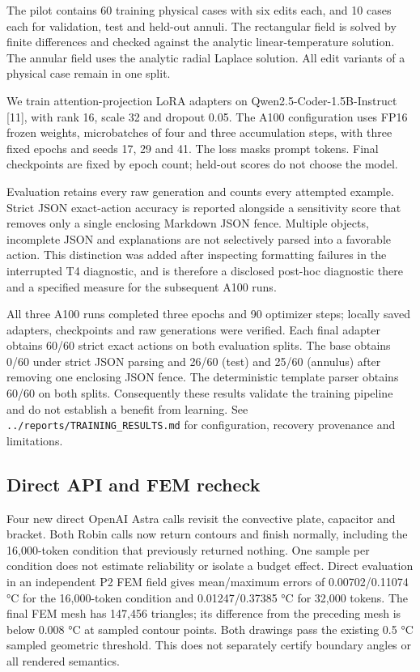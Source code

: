 \documentclass[
  11pt,
  a4paper,
]{article}
\begin{document}
The pilot contains 60 training physical cases with six edits each, and
10 cases each for validation, test and held-out annuli. The rectangular
field is solved by finite differences and checked against the analytic
linear-temperature solution. The annular field uses the analytic radial
Laplace solution. All edit variants of a physical case remain in one
split.

We train attention-projection LoRA adapters on
Qwen2.5-Coder-1.5B-Instruct {[}11{]}, with rank 16, scale 32 and dropout
0.05. The A100 configuration uses FP16 frozen weights, microbatches of
four and three accumulation steps, with three fixed epochs and seeds 17,
29 and 41. The loss masks prompt tokens. Final checkpoints are fixed by
epoch count; held-out scores do not choose the model.

Evaluation retains every raw generation and counts every attempted
example. Strict JSON exact-action accuracy is reported alongside a
sensitivity score that removes only a single enclosing Markdown JSON
fence. Multiple objects, incomplete JSON and explanations are not
selectively parsed into a favorable action. This distinction was added
after inspecting formatting failures in the interrupted T4 diagnostic,
and is therefore a disclosed post-hoc diagnostic there and a specified
measure for the subsequent A100 runs.

All three A100 runs completed three epochs and 90 optimizer steps;
locally saved adapters, checkpoints and raw generations were verified.
Each final adapter obtains 60/60 strict exact actions on both evaluation
splits. The base obtains 0/60 under strict JSON parsing and 26/60 (test)
and 25/60 (annulus) after removing one enclosing JSON fence. The
deterministic template parser obtains 60/60 on both splits. Consequently
these results validate the training pipeline and do not establish a
benefit from learning. See \nolinkurl{../reports/TRAINING_RESULTS.md}
for configuration, recovery provenance and limitations.

\subsection{Direct API and FEM
recheck}\label{direct-api-and-fem-recheck}

Four new direct OpenAI Astra calls revisit the convective plate,
capacitor and bracket. Both Robin calls now return contours and finish
normally, including the 16,000-token condition that previously returned
nothing. One sample per condition does not estimate reliability or
isolate a budget effect. Direct evaluation in an independent P2 FEM
field gives mean/maximum errors of 0.00702/0.11074 °C for the
16,000-token condition and 0.01247/0.37385 °C for 32,000 tokens. The
final FEM mesh has 147,456 triangles; its difference from the preceding
mesh is below 0.008 °C at sampled contour points. Both drawings pass the
existing 0.5 °C sampled geometric threshold. This does not separately
certify boundary angles or all rendered semantics.
\end{document}
